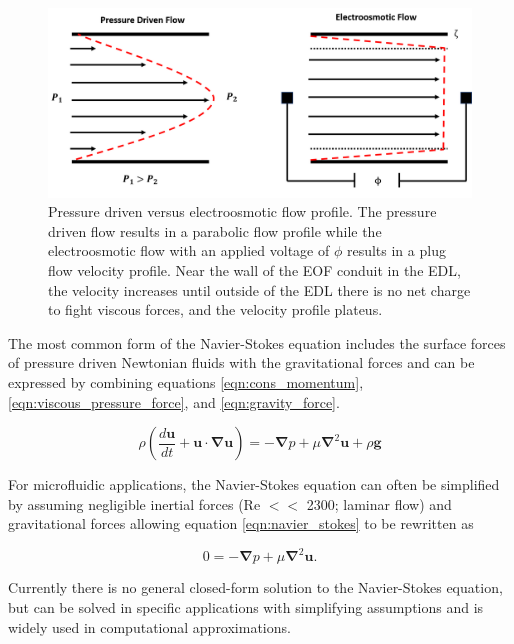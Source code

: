 \begin{figure}[ht]
    \centering
    \includegraphics[width = \textwidth]{images/plugVsParabolic.png}
    \caption[Pressure driven versus electroosmotic flow profile]{Pressure driven versus electroosmotic flow profile. The pressure driven flow results in a parabolic flow profile while the electroosmotic flow with an applied voltage of $\phi$ results in a plug flow velocity profile. Near the wall of the EOF conduit in the EDL, the velocity increases until outside of the EDL there is no net charge to fight viscous forces, and the velocity profile plateus.}
    \label{fig:plug_vs_parabolic_flow}
\end{figure}

\par The most common form of the Navier-Stokes equation includes the surface forces of pressure driven Newtonian fluids with the gravitational forces and can be expressed by combining equations \ref{eqn:cons_momentum}, \ref{eqn:viscous_pressure_force}, and \ref{eqn:gravity_force}. 

\begin{equation}
    \rho(\frac{d\textbf{u}}{dt} + \textbf{u}\cdot\boldsymbol{\nabla}\textbf{u}) = -\boldsymbol{\nabla}p + \mu\boldsymbol{\nabla}^2\textbf{u} + \rho \textbf{g}
    \label{eqn:navier_stokes}
\end{equation}

\noindent For microfluidic applications, the Navier-Stokes equation can often be simplified by assuming negligible inertial forces (Re $<<$ 2300; laminar flow) and gravitational forces allowing equation \ref{eqn:navier_stokes} to be rewritten as

\begin{equation}
        0 = -\boldsymbol{\nabla}p + \mu\boldsymbol{\nabla}^2\textbf{u}.
\end{equation}

\par Currently there is no general closed-form solution to the Navier-Stokes equation, but can be solved in specific applications with simplifying assumptions and is widely used in computational approximations.

